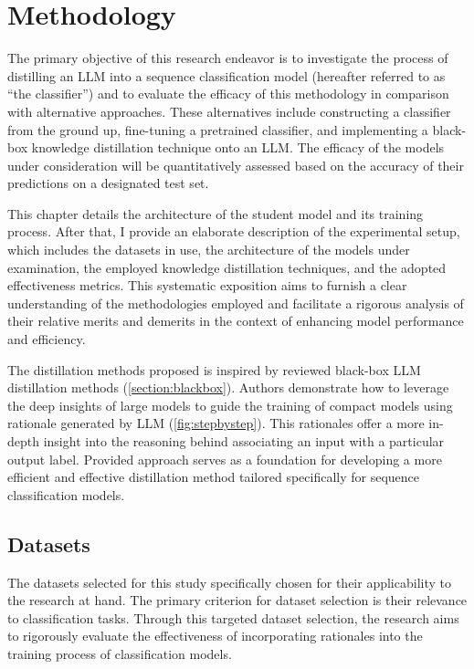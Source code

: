 \chapter{Methodology}
\label{chap:met}

The primary objective of this research endeavor is to investigate the process of distilling an LLM into a sequence classification model (hereafter referred to as ``the classifier'') and to evaluate the efficacy of this methodology in comparison with alternative approaches. These alternatives include constructing a classifier from the ground up, fine-tuning a pretrained classifier, and implementing a black-box knowledge distillation technique onto an LLM\@. The efficacy of the models under consideration will be quantitatively assessed based on the accuracy of their predictions on a designated test set.

This chapter details the architecture of the student model and its training process. After that, I provide an elaborate description of the experimental setup, which includes the datasets in use, the architecture of the models under examination, the employed knowledge distillation techniques, and the adopted effectiveness metrics. This systematic exposition aims to furnish a clear understanding of the methodologies employed and facilitate a rigorous analysis of their relative merits and demerits in the context of enhancing model performance and efficiency.

The distillation methods proposed is inspired by reviewed black-box LLM distillation methods (\autoref{section:blackbox}). Authors demonstrate how to leverage the deep insights of large models to guide the training of compact models using rationale generated by LLM (\autoref{fig:stepbystep}). This rationales offer a more in-depth insight into the reasoning behind associating an input with a particular output label. Provided approach serves as a foundation for developing a more efficient and effective distillation method tailored specifically for sequence classification models.

\section{Datasets}

The datasets selected for this study specifically chosen for their applicability to the research at hand. The primary criterion for dataset selection is their relevance to classification tasks. Through this targeted dataset selection, the research aims to rigorously evaluate the effectiveness of incorporating rationales into the training process of classification models.

